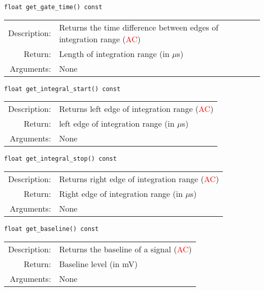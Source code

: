 \begin{lstlisting}
float get_gate_time() const
\end{lstlisting}
\begin{tabularx}{\textwidth}{rp{11cm}}
    \toprule
    Description: & Returns the time difference between edges of integration range (\textcolor{red}{AC})\\
    Return: & Length of integration range (in $\mu$s)\\
    Arguments: & None\\
    \bottomrule
\end{tabularx}
\vspace{1cm}

\begin{lstlisting}
float get_integral_start() const
\end{lstlisting}
\begin{tabularx}{\textwidth}{rp{11cm}}
    \toprule
    Description: & Returns left edge of integration range (\textcolor{red}{AC})\\
    Return: & left edge of integration range (in $\mu$s)\\
    Arguments: & None\\
    \bottomrule
\end{tabularx}
\vspace{1cm}

\begin{lstlisting}
float get_integral_stop() const
\end{lstlisting}
\begin{tabularx}{\textwidth}{rp{11cm}}
    \toprule
    Description: & Returns right edge of integration range (\textcolor{red}{AC})\\
    Return: & Right edge of integration range (in $\mu$s)\\
    Arguments: & None\\
    \bottomrule
\end{tabularx}
\vspace{1cm}

\begin{lstlisting}
float get_baseline() const
\end{lstlisting}
\begin{tabularx}{\textwidth}{rp{11cm}}
    \toprule
    Description: & Returns the baseline of a signal (\textcolor{red}{AC})\\
    Return: & Baseline level (in mV)\\
    Arguments: & None\\
    \bottomrule
\end{tabularx}
\vspace{1cm}

